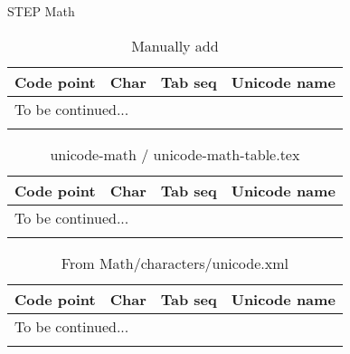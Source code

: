 \documentclass[a4paper]{article}
\begin{document}
{\Large STEP Math}

\begin{longtable}{ccll}
  \caption{Manually add} \\
  \toprule
  Code point & Char & Tab seq & Unicode name \\
  \hline \endhead
  \multicolumn{4}{l}{To be continued...} \\ 
  \midrule \endfoot
  \bottomrule \endlastfoot

  

  \\ \bottomrule
\end{longtable}

\cleardoublepage

\begin{longtable}{ccll}
  \caption{unicode-math / unicode-math-table.tex} \\
  \toprule
  Code point & Char & Tab seq & Unicode name \\
  \hline \endhead
  \multicolumn{4}{l}{To be continued...} \\ 
  \midrule \endfoot
  \bottomrule \endlastfoot

  

  \\ \bottomrule
\end{longtable}

\cleardoublepage

\begin{longtable}{ccll}
  \caption{From Math/characters/unicode.xml} \\
  \toprule
  Code point & Char & Tab seq & Unicode name \\
  \hline \endhead
  \multicolumn{4}{l}{To be continued...} \\ 
  \midrule \endfoot
  \bottomrule \endlastfoot

  

  \\ \bottomrule
\end{longtable}
\end{document}
